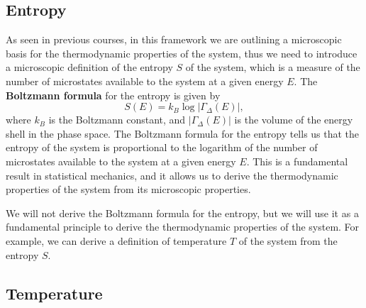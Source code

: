 \subsection{Entropy}

As seen in previous courses, in this framework we are outlining a microscopic basis for the thermodynamic properties of the system, thus we need to introduce a microscopic definition of the entropy \(S\) of the system, which is a measure of the number of microstates available to the system at a given energy \(E\). The \textbf{Boltzmann formula} for the entropy is given by
\begin{equation}
    S(E) = k_B \log |\Gamma_{\Delta}(E)|,
    \label{eq:microcanonical_entropy}
\end{equation}
where \(k_B\) is the Boltzmann constant, and \(|\Gamma_{\Delta}(E)|\) is the volume of the energy shell in the phase space. The Boltzmann formula for the entropy tells us that the entropy of the system is proportional to the logarithm of the number of microstates available to the system at a given energy \(E\). This is a fundamental result in statistical mechanics, and it allows us to derive the thermodynamic properties of the system from its microscopic properties.

We will not derive the Boltzmann formula for the entropy, but we will use it as a fundamental principle to derive the thermodynamic properties of the system. For example, we can derive a definition of temperature \(T\) of the system from the entropy \(S\).

\subsection{Temperature}

